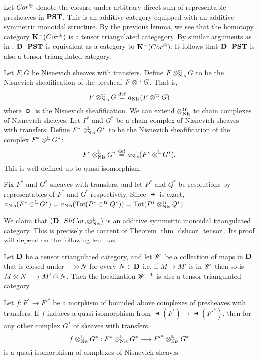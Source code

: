 Let $\Cor^{\oplus}$ denote the closure under arbitrary direct 
sum of representable presheaves in $\PST$. This is an additive
category equipped with an additive symmetric monoidal structure.
By the previous lemma, we see that the homotopy category 
$\DCat[K]^-(\Cor^{\oplus})$ is a tensor triangulated categegory.
By similar arguments as in \cite[10.4.8]{WH}, $\DCat[D]^-\PST$
is equivalent as a category to $\DCat[K]^-(\Cor^{\oplus})$.
It follows that $\DCat[D]^-\PST$ is also a tensor triangulated 
category.

\begin{defn}\label{def_shcor_tensor}
Let $F, G$ be Nisnevich sheaves with transfers. Define
$F \ttrNis G$ to be the Nisnevich sheafification of the presheaf
$F \ttr G$. That is,
\[
F \ttrNis G \defeq \nis(F \ttr G)
\]
where $\nis$ is the Nisnevich sheafification. We can extend 
$\ttrNis$ to chain complexes of Nisnevich sheaves. Let $F^*$ and 
$G^*$ be a chain complex of Nisnevich sheaves with transfers. 
Define $F^* \tLNis G^*$ to be the Nisnevich sheafification of the 
complex $F^* \tL G^*$:
\[
F^* \tLNis G^* \defeq \nis(F^* \tL G^*).
\]
This is well-defined up to quasi-isomorphism.
\end{defn}

\begin{rmk}
Fix $F^*$ and $G^*$ sheaves with transfers, and let $P^*$ and 
$Q^*$ be resolutions by representables of $F^*$ and $G^*$ 
respectively. Since $\nis$ is exact, $\nis(F^* \tL G^*) = 
\nis(\Tot(P^* \ttr Q^*)) = \Tot(P^* \ttrNis Q^*)$.
\end{rmk}

We claim that $(\DCat[D]^-\ShCor, \tLNis)$ is an additive 
symmetric monoidal triangulated category. This is precisely the
content of Theorem \ref{thm_dshcor_tensor}. Its proof will
depend on the following lemmas:

\begin{lem}\label{lem_loc_and_tensor}
Let $\DCat$ be a tensor triangulated category, and let $\Cat{W}$
be a collection of maps in $\DCat$ that is closed under $-\tensor 
N$ for every $N \in \DCat$ i.e. if $M \to M'$ is in $\Cat{W}$ then 
so is $M \tensor N \to M' \tensor N$. Then the localization $\DCat 
[\Cat{W}^{-1}]$ is also a tensor triangulated category.
\end{lem}

\begin{lem}
Let $f: F^* \to {F'}^*$ be a morphism of bounded above complexes of
presheaves with transfers. If $f$ induces a quasi-isomorphism
from $\nis(F^*) \to \nis({F'}^*)$, then for any other complex $G^*$
of sheaves with transfers,
\[
f \tLNis G^* : F^* \tLNis G^* \to {F'}^* \tLNis G^*
\]
is a quasi-isomorphism of complexes of Nisnevich sheaves.
\end{lem}

